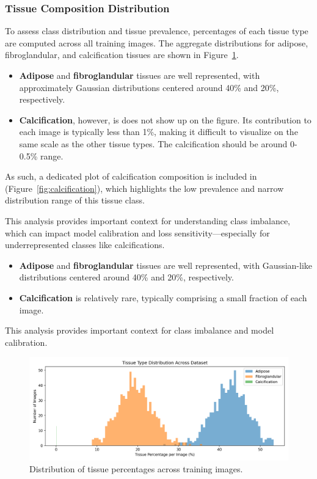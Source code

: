 \subsubsection{Tissue Composition Distribution}

To assess class distribution and tissue prevalence, percentages of each tissue type are computed across all training images. 
The aggregate distributions for adipose, fibroglandular, and calcification tissues are shown in Figure~\ref{fig:composition}. 

\begin{itemize}
    \item \textbf{Adipose} and \textbf{fibroglandular} tissues are well represented, with approximately Gaussian distributions centered around 40\% and 20\%, respectively.
    \item \textbf{Calcification}, however, is does not show up on the figure. Its contribution to each image is typically less than 1\%, making it difficult to visualize 
          on the same scale as the other tissue types. The calcification should be around 0-0.5\% range.
\end{itemize}

As such, a dedicated plot of calcification composition is included in (Figure~\ref{fig:calcification}), which highlights the low prevalence and narrow distribution range of this tissue class.

This analysis provides important context for understanding class imbalance, which can impact model calibration and loss sensitivity—especially for underrepresented classes like calcifications.

\begin{itemize}
    \item \textbf{Adipose} and \textbf{fibroglandular} tissues are well represented, with Gaussian-like distributions centered around 40\% and 20\%, respectively.
    \item \textbf{Calcification} is relatively rare, typically comprising a small fraction of each image.
\end{itemize}

This analysis provides important context for class imbalance and model calibration.

\begin{figure}[h!]
    \centering
    \includegraphics[width=\linewidth]{../fig/tissue_percentage_distribution.png}
    \caption{Distribution of tissue percentages across training images.}
    \label{fig:composition}
\end{figure}

